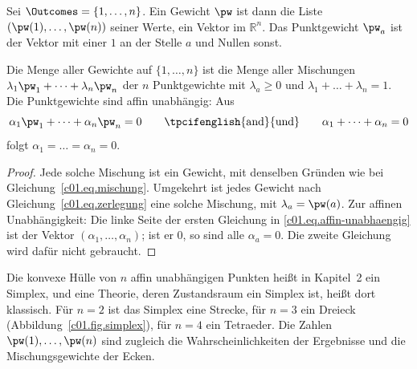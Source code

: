 \begin{vertiefung}[id=c01.v1,
    titel={Die Menge aller Präparationen ist ein Simplex},
    wozu={Der Kern zeigt, dass jedes Gewicht eindeutig aus Punktgewichten gemischt ist.
      Hier wird daraus ein Bild: Für $n$ Ergebnisse bilden die Gewichte eine Strecke, ein
      Dreieck, ein Tetraeder und so weiter, und die Punktgewichte sind die Ecken.},
    voraussetzung={Abschnitt~\ref{c01.s3.1}; Vektoren im $\mathbb{R}^n$. Der Rest dieses
      Kapitels braucht den Block nicht; Kapitel~2 greift das Bild auf.},
    zurueck={Die Gewichte auf $n$ Ergebnissen bilden einen Körper mit $n$ Ecken, den
      Punktgewichten; jeder Punkt darin ist auf genau eine Weise aus den Ecken gemischt.}]
  Sei $\Outcomes = \{1, \dots, n\}$. Ein Gewicht $\pw$ ist dann die Liste
  $(\pw(1), \dots, \pw(n))$ seiner Werte, ein Vektor im $\mathbb{R}^n$. Das Punktgewicht
  $\pw_a$ ist der Vektor mit einer $1$ an der Stelle $a$ und Nullen sonst.

  \begin{proposition}\label{c01.prop.simplex}
    Die Menge aller Gewichte auf $\{1, \dots, n\}$ ist die Menge aller Mischungen
    $\lambda_1 \pw_1 + \dots + \lambda_n \pw_n$ der $n$ Punktgewichte mit
    $\lambda_a \geq 0$ und $\lambda_1 + \dots + \lambda_n = 1$. Die Punktgewichte sind
    affin unabhängig: Aus
    \begin{equation}\label{c01.eq.affin-unabhaengig}
      \alpha_1 \pw_1 + \dots + \alpha_n \pw_n = 0
      \qquad \text{\tpcifenglish{and}{und}} \qquad
      \alpha_1 + \dots + \alpha_n = 0
    \end{equation}
    folgt $\alpha_1 = \dots = \alpha_n = 0$.
  \end{proposition}
  \begin{proof}
    Jede solche Mischung ist ein Gewicht, mit denselben Gründen wie bei
    Gleichung~\eqref{c01.eq.mischung}. Umgekehrt ist jedes Gewicht nach
    Gleichung~\eqref{c01.eq.zerlegung} eine solche Mischung, mit $\lambda_a = \pw(a)$. Zur
    affinen Unabhängigkeit: Die linke Seite der ersten Gleichung in
    \eqref{c01.eq.affin-unabhaengig} ist der Vektor $(\alpha_1, \dots, \alpha_n)$; ist er
    $0$, so sind alle $\alpha_a = 0$. Die zweite Gleichung wird dafür nicht gebraucht.
  \end{proof}

  Die konvexe Hülle von $n$ affin unabhängigen Punkten heißt in Kapitel~2 ein Simplex, und
  eine Theorie, deren Zustandsraum ein Simplex ist, heißt dort klassisch. Für $n = 2$ ist
  das Simplex eine Strecke, für $n = 3$ ein Dreieck (Abbildung~\ref{c01.fig.simplex}), für
  $n = 4$ ein Tetraeder. Die Zahlen $\pw(1), \dots, \pw(n)$ sind zugleich die
  Wahrscheinlichkeiten der Ergebnisse und die Mischungsgewichte der Ecken.


\end{vertiefung}

